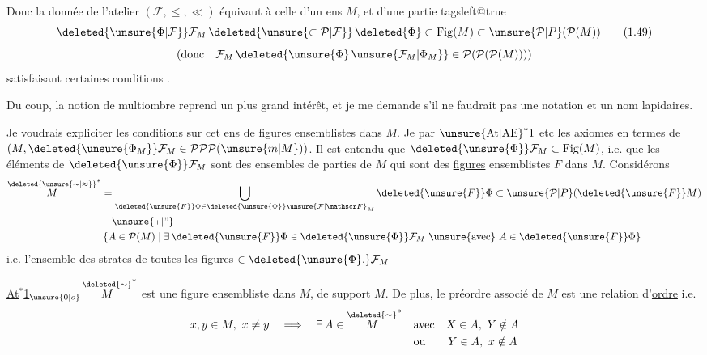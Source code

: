 Donc la donnée de l'atelier $(\mathcal F,\leq,\ll)$ équivaut à celle d'un ens $M$, et d'une partie
\begingroup\csname tagsleft@true\endcsname
\[
 \deleted{\unsure{\Phi|\mathcal F}}\mathcal F_M\,
 \deleted{\unsure{\subset\mathcal P|\mathcal F}}\,
 \deleted{\Phi}\subset\mathrm{Fig}(M)\subset
 \unsure{\mathcal P|P}(\mathcal P(M))
 \tag*{(1.49)}
\]
\endgroup
\[
 \left(\text{donc}\quad
 \mathcal F_M\,\deleted{\unsure{\Phi}\,\unsure{\mathcal F_M|\Phi_M}}
 \in\mathcal P(\mathcal P(\mathcal P(M)))\right)
\]
satisfaisant certaines conditions .

Du coup, la notion de  multiombre reprend un plus grand intérêt, et je me demande s'il ne faudrait pas une notation  et un nom  lapidaires.

Je voudrais expliciter les conditions sur cet ens de figures ensemblistes dans $M$. Je  par ${\unsure{\mathrm{At}|\mathrm{AE}}}^{*}1$ etc les axiomes en termes de $(M,\deleted{\unsure{\Phi_M}}\mathcal F_M\in\mathcal P\mathcal P\mathcal P(\unsure{m|M}))$.
 Il est entendu que $\deleted{\unsure{\Phi}}\mathcal F_M\subset\mathrm{Fig}(M)$, i.e.  que les éléments de $\deleted{\unsure{\Phi}}\mathcal F_M$ sont des ensembles de parties de $M$ qui sont des \uline{figures} ensemblistes $F$ dans $M$.   Considérons
\[
\begin{aligned}
 \overset{\deleted{\unsure{\sim|\approx}}}{M}^{*}
  &=\bigcup_{\deleted{\unsure{F}}\Phi\in\deleted{\unsure{\Phi}}\unsure{\mathcal F|\mathscr F}_M}
       \deleted{\unsure{F}}\Phi\subset\unsure{\mathcal P|P}(\deleted{\unsure{F}}M)\\
 &\quad\unsure{\shortparallel|\text{''}}\\
 &\left\{A\in\mathcal P(M)\mid\exists\,\deleted{\unsure{F}}\Phi\in\deleted{\unsure{\Phi}}\mathcal F_M
       \ \text{\unsure{avec}}\ A\in\deleted{\unsure{F}}\Phi\right\}
\end{aligned}
\]
i.e. l'ensemble des strates de toutes les figures $\in\deleted{\unsure{\Phi}.}\mathcal F_M$

\uline{At$^{*}$1}$_{\unsure{0|o}}$\quad $\overset{\deleted{\sim}}{M}^{*}$ est une figure ensembliste
\margin{\rule{0.45pt}{3.5\baselineskip}}
dans $M$, de support $M$. De plus, le préordre associé de $M$  est une relation d'\uline{ordre} i.e.
\[
\begin{aligned}
 x,y\in M,\ x\neq y\quad\Longrightarrow\quad \exists\, A\in\overset{\deleted{\sim}}{M}^{*}
 &\quad\text{avec}\quad X\in A,\ Y\notin A\\
 &\quad\text{ou}\qquad Y\in A,\ x\notin A
\end{aligned}
\]

